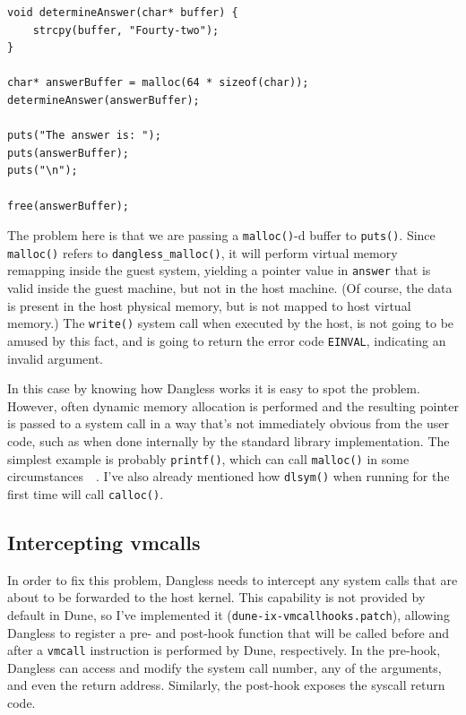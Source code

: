 \begin{lstlisting}
void determineAnswer(char* buffer) {
	strcpy(buffer, "Fourty-two");
}

char* answerBuffer = malloc(64 * sizeof(char));
determineAnswer(answerBuffer);

puts("The answer is: ");
puts(answerBuffer);
puts("\n");

free(answerBuffer);
\end{lstlisting}

The problem here is that we are passing a \lstinline!malloc()!-d buffer to \lstinline!puts()!. Since \lstinline!malloc()! refers to \lstinline!dangless_malloc()!, it will perform virtual memory remapping inside the guest system, yielding a pointer value in \lstinline!answer! that is valid inside the guest machine, but not in the host machine. (Of course, the data is present in the host physical memory, but is not mapped to host virtual memory.) The \lstinline!write()! system call when executed by the host, is not going to be amused by this fact, and is going to return the error code \texttt{EINVAL}, indicating an invalid argument.

In this case by knowing how Dangless works it is easy to spot the problem. However, often dynamic memory allocation is performed and the resulting pointer is passed to a system call in a way that's not immediately obvious from the user code, such as when done internally by the standard library implementation. The simplest example is probably \lstinline!printf()!, which can call \lstinline!malloc()! in some circumstances~\cite{glibc-printf-malloc}~\cite{glibc-printf-malloc-vulnerability}. I've also already mentioned how \lstinline!dlsym()! when running for the first time will call \lstinline!calloc()!.

\subsection{Intercepting vmcalls}

In order to fix this problem, Dangless needs to intercept any system calls that are about to be forwarded to the host kernel. This capability is not provided by default in Dune, so I've implemented it (\texttt{dune-ix-vmcallhooks.patch}), allowing Dangless to register a pre- and post-hook function that will be called before and after a \lstinline!vmcall! instruction is performed by Dune, respectively. In the pre-hook, Dangless can access and modify the system call number, any of the arguments, and even the return address. Similarly, the post-hook exposes the syscall return code.

